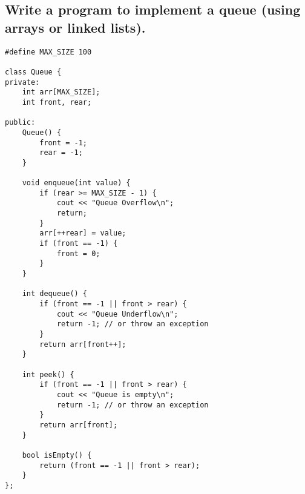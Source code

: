 \subsection{Write a program to implement a queue (using arrays or linked lists).}
\begin{tcolorbox}[title=]
\begin{verbatim}
#define MAX_SIZE 100

class Queue {
private:
    int arr[MAX_SIZE];
    int front, rear;

public:
    Queue() {
        front = -1;
        rear = -1;
    }

    void enqueue(int value) {
        if (rear >= MAX_SIZE - 1) {
            cout << "Queue Overflow\n";
            return;
        }
        arr[++rear] = value;
        if (front == -1) {
            front = 0;
        }
    }

    int dequeue() {
        if (front == -1 || front > rear) {
            cout << "Queue Underflow\n";
            return -1; // or throw an exception
        }
        return arr[front++];
    }

    int peek() {
        if (front == -1 || front > rear) {
            cout << "Queue is empty\n";
            return -1; // or throw an exception
        }
        return arr[front];
    }

    bool isEmpty() {
        return (front == -1 || front > rear);
    }
};  
\end{verbatim}
\end{tcolorbox}

